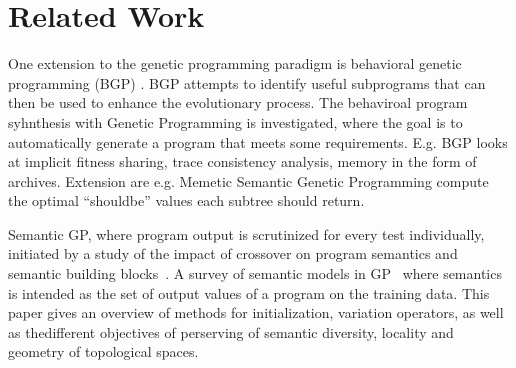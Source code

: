 \section{Related Work}
\label{sec:related-work}

One extension to the genetic programming paradigm is behavioral
genetic programming (BGP) \cite{krawiec}.  BGP attempts to identify
useful subprograms that can then be used to enhance the evolutionary
process. The behaviroal program syhnthesis with Genetic
Programming\cite{krawiec2016behavioral} is investigated, where the
goal is to automatically generate a program that meets some
requirements. E.g. BGP looks at implicit fitness
sharing\cite{mckay2000fitness}, trace consistency analysis, memory in
the form of archives\cite{haynes1997line}. Extension are e.g. Memetic Semantic Genetic
Programming\cite{Ffrancon:2015:MSG:2739480.2754697} compute the
optimal ``shouldbe'' values each subtree should return.


Semantic GP, where program output is scrutinized for every test
individually, initiated by a study of the impact of crossover on
program semantics and semantic building
blocks~\cite{mcphee2008semantic}. A survey of semantic models in
GP~\cite{vanneschi2014survey} where semantics is intended as the set
of output values of a program on the training data. This paper gives
an overview of methods for initialization, variation operators, as
well as thedifferent objectives of perserving of semantic diversity,
locality and geometry of topological spaces.

